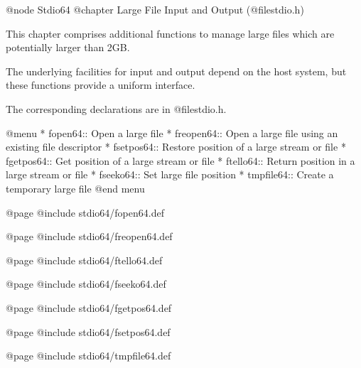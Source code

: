 @node Stdio64
@chapter Large File Input and Output (@file{stdio.h})

This chapter comprises additional functions to manage large files which
are potentially larger than 2GB.

The underlying facilities for input and output depend on the host
system, but these functions provide a uniform interface.

The corresponding declarations are in @file{stdio.h}.

@menu
* fopen64::     Open a large file
* freopen64::   Open a large file using an existing file descriptor
* fsetpos64::   Restore position of a large stream or file
* fgetpos64::   Get position of a large stream or file
* ftello64::    Return position in a large stream or file
* fseeko64::    Set large file position
* tmpfile64::   Create a temporary large file
@end menu

@page
@include stdio64/fopen64.def

@page
@include stdio64/freopen64.def

@page
@include stdio64/ftello64.def

@page
@include stdio64/fseeko64.def

@page
@include stdio64/fgetpos64.def

@page
@include stdio64/fsetpos64.def

@page
@include stdio64/tmpfile64.def


